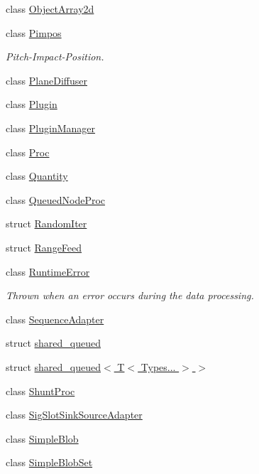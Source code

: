 \begin{DoxyCompactItemize}
\item 
class \hyperlink{class_wire_cell_1_1_object_array2d}{Object\+Array2d}
\item 
class \hyperlink{class_wire_cell_1_1_pimpos}{Pimpos}
\begin{DoxyCompactList}\small\item\em Pitch-\/\+Impact-\/\+Position. \end{DoxyCompactList}\item 
class \hyperlink{class_wire_cell_1_1_plane_diffuser}{Plane\+Diffuser}
\item 
class \hyperlink{class_wire_cell_1_1_plugin}{Plugin}
\item 
class \hyperlink{class_wire_cell_1_1_plugin_manager}{Plugin\+Manager}
\item 
class \hyperlink{class_wire_cell_1_1_proc}{Proc}
\item 
class \hyperlink{class_wire_cell_1_1_quantity}{Quantity}
\item 
class \hyperlink{class_wire_cell_1_1_queued_node_proc}{Queued\+Node\+Proc}
\item 
struct \hyperlink{struct_wire_cell_1_1_random_iter}{Random\+Iter}
\item 
struct \hyperlink{struct_wire_cell_1_1_range_feed}{Range\+Feed}
\item 
class \hyperlink{class_wire_cell_1_1_runtime_error}{Runtime\+Error}
\begin{DoxyCompactList}\small\item\em Thrown when an error occurs during the data processing. \end{DoxyCompactList}\item 
class \hyperlink{class_wire_cell_1_1_sequence_adapter}{Sequence\+Adapter}
\item 
struct \hyperlink{struct_wire_cell_1_1shared__queued}{shared\+\_\+queued}
\item 
struct \hyperlink{struct_wire_cell_1_1shared__queued_3_01_t_3_01_types_8_8_8_01_4_01_4}{shared\+\_\+queued$<$ T$<$ Types... $>$ $>$}
\item 
class \hyperlink{class_wire_cell_1_1_shunt_proc}{Shunt\+Proc}
\item 
class \hyperlink{class_wire_cell_1_1_sig_slot_sink_source_adapter}{Sig\+Slot\+Sink\+Source\+Adapter}
\item 
class \hyperlink{class_wire_cell_1_1_simple_blob}{Simple\+Blob}
\item 
class \hyperlink{class_wire_cell_1_1_simple_blob_set}{Simple\+Blob\+Set}
\item 

\end{DoxyCompactItemize}
